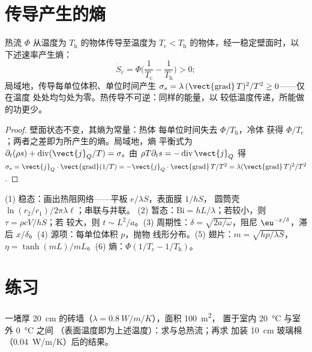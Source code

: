 \section{传导产生的熵}

\begin{proposition}[熵的产生]\label{prop:b2:heat-conduction:entropy}
热流 $\Phi$ 从温度为 $T_{\text{h}}$ 的物体传导至温度为
$T_{\text{c}} < T_{\text{h}}$ 的物体，经一稳定壁面时，以
下述速率产生熵：
\[
\dot S_{\text{c}} = \Phi\Big(\frac{1}{T_{\text{c}}} - \frac{1}{T_{\text{h}}}\Big) > 0 ;
\]
局域地，传导每单位体积、单位时间产生 $\sigma_s = \lambda\,(\vect{\operatorname{grad}}\,T)^2/T^2
\ge 0$——仅在温度
处处均匀处为零。热传导不可逆：同样的能量，以
较低温度传递，所能做的功更少。
\end{proposition}

\begin{proof}
壁面状态不变，其熵为常量：热体
每单位时间失去 $\Phi/T_{\text{h}}$，冷体
获得 $\Phi/T_{\text{c}}$；两者之差即为所产生的熵。局域地，熵
平衡式为 $\partial_t(\rho s) + \operatorname{div}(\vect{j}_Q/T) = \sigma_s$
由 $\rho T\partial_t s = -\operatorname{div}\vect{j}_Q$ 得 $\sigma_s =
\vect{j}_Q\cdot\vect{\operatorname{grad}}(1/T) = -\vect{j}_Q\cdot
\vect{\operatorname{grad}}\,T/T^2 = \lambda(\vect{\operatorname{grad}}\,T)^2/T^2$.
\end{proof}

\begin{method}[传导估算]\label{meth:b2:heat-conduction:method}
(1) 稳态：画出热阻网络——平板 $e/\lambda S$，表面膜 $1/hS$，
圆筒壳 $\ln(r_2/r_1)/2\pi\lambda\ell$；串联与并联。
(2) 暂态：$\mathrm{Bi} = hL/\lambda$；若较小，则 $\tau = \rho cV/hS$；若
较大，则 $t \sim L^2/a$。(3) 周期性：$\delta = \sqrt{2a/\omega}$，阻尼
$\eu^{-x/\delta}$，滞后 $x/\delta$。(4) 源项：每单位体积 $p$，抛物
线形分布。(5) 翅片：$m = \sqrt{hp/\lambda S}$，$\eta = \tanh(mL)/mL$。(6)
熵：$\Phi(1/T_{\text{c}} - 1/T_{\text{h}})$。
\end{method}

\section{练习}

\begin{exercise}[$\star$]\label{exo:b2:heat-conduction:1}
一堵厚 \qty{20}{cm} 的砖墙（$\lambda = \qty{0.8}{W/m/K}$），面积 \qty{100}{m^2}，
置于室内 \qty{20}{\celsius} 与室外 \qty{0}{\celsius} 之间
（表面温度即为上述温度）：求与总热流；再求
加装 \qty{10}{cm} 玻璃棉（\qty{0.04}{W/m/K}）后的结果。
\end{exercise}

